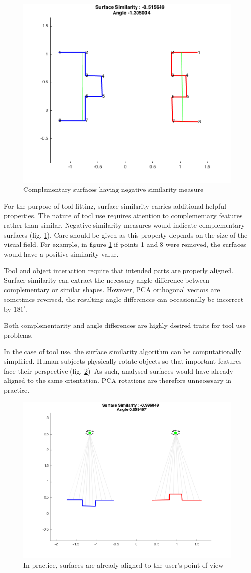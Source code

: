 \documentclass[
    floatsintext
]{article}
\begin{document}
\begin{figure}[h]
  \centering
  \includegraphics[width=.6\textwidth]{./figures/complementary.png}
  \caption{Complementary surfaces having negative similarity measure}
  \label{fig:complementary}
\end{figure}  

For the purpose of tool fitting, surface similarity carries additional helpful properties. 
The nature of tool use requires attention to complementary features rather than similar. 
Negative similarity measures would indicate complementary surfaces (fig. \ref{fig:complementary}). 
Care should be given as this property depends on the size of the visual field.
For example, in figure \ref{fig:complementary} if points 1 and 8 were removed, the surfaces would have 
a positive similarity value. 

Tool and object interaction require that intended parts are properly aligned.
Surface similarity can extract the necessary angle difference between complementary or similar shapes.
However, PCA orthogonal vectors are sometimes reversed, the resulting angle differences can occasionally be incorrect by $180^{\circ}$. 

Both complementarity and angle differences are highly desired traits for tool use problems.


In the case of tool use, the surface similarity algorithm can be computationally simplified.
Human subjects physically rotate objects so that important features face their perspective (fig. \ref{fig:same_orientation}). 
As such, analysed surfaces would have already aligned to the same orientation.
PCA rotations are therefore unnecessary in practice. 

\begin{figure}[!h]
  \centering
  \includegraphics[width=.6\textwidth]{./figures/same_orientation.png}
  \caption{In practice, surfaces are already aligned to the user's point of view}
  \label{fig:same_orientation}
\end{figure}  
\end{document}
